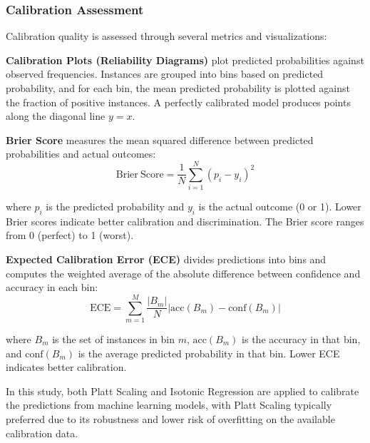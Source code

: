 \subsubsection{Calibration Assessment}

Calibration quality is assessed through several metrics and visualizations:

\textbf{Calibration Plots (Reliability Diagrams)} plot predicted probabilities against observed frequencies. Instances are grouped into bins based on predicted probability, and for each bin, the mean predicted probability is plotted against the fraction of positive instances. A perfectly calibrated model produces points along the diagonal line $y=x$.

\textbf{Brier Score} measures the mean squared difference between predicted probabilities and actual outcomes:
$$\mathrm{Brier\ Score} = \frac{1}{N} \sum_{i=1}^{N} (p_i - y_i)^2$$

where $p_i$ is the predicted probability and $y_i$ is the actual outcome (0 or 1). Lower Brier scores indicate better calibration and discrimination. The Brier score ranges from 0 (perfect) to 1 (worst).

\textbf{Expected Calibration Error (ECE)} divides predictions into bins and computes the weighted average of the absolute difference between confidence and accuracy in each bin:
$$\mathrm{ECE} = \sum_{m=1}^{M} \frac{|B_m|}{N} |\mathrm{acc}(B_m) - \mathrm{conf}(B_m)|$$

where $B_m$ is the set of instances in bin $m$, $\mathrm{acc}(B_m)$ is the accuracy in that bin, and $\mathrm{conf}(B_m)$ is the average predicted probability in that bin. Lower ECE indicates better calibration.

In this study, both Platt Scaling and Isotonic Regression are applied to calibrate the predictions from machine learning models, with Platt Scaling typically preferred due to its robustness and lower risk of overfitting on the available calibration data.
